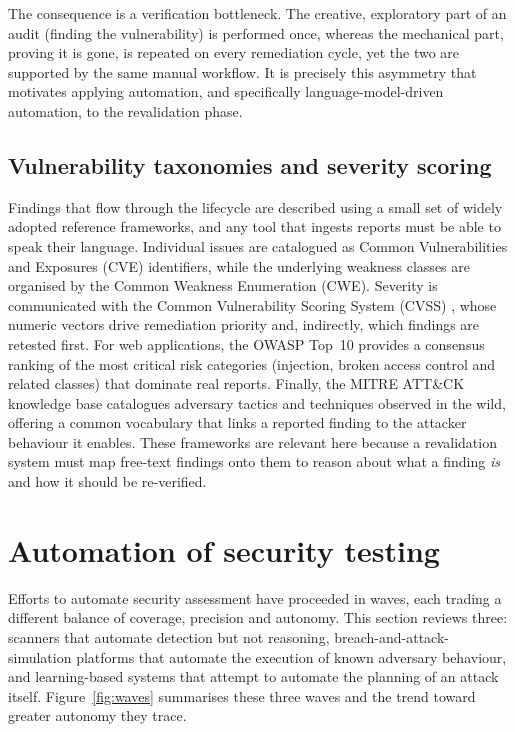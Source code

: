 The consequence is a verification bottleneck. The creative, exploratory part of an
audit (finding the vulnerability) is performed once, whereas the mechanical
part, proving it is gone, is repeated on every remediation cycle, yet the two
are supported by the same manual workflow. It is precisely this asymmetry that
motivates applying automation, and specifically language-model-driven automation,
to the revalidation phase.

\subsection{Vulnerability taxonomies and severity scoring}
\label{subsec:taxonomies}

Findings that flow through the lifecycle are described using a small set of widely
adopted reference frameworks, and any tool that ingests reports must be able to
speak their language. Individual issues are catalogued as Common Vulnerabilities
and Exposures (CVE) identifiers, while the underlying weakness classes
are organised by the Common Weakness Enumeration (CWE). Severity is
communicated with the Common Vulnerability Scoring System (CVSS) \cite{cvss},
whose numeric vectors drive remediation priority and, indirectly, which findings
are retested first. For web applications, the OWASP Top~10
provides a consensus ranking of the most critical risk categories (injection,
broken access control and related classes) that dominate real reports.
Finally, the MITRE ATT\&CK knowledge base \cite{mitre_attack} catalogues adversary
tactics and techniques observed in the wild, offering a common vocabulary that
links a reported finding to the attacker behaviour it enables. These frameworks
are relevant here because a revalidation system must map free-text findings onto
them to reason about what a finding \emph{is} and how it should be re-verified.

\section{Automation of security testing}
\label{sec:automation}

Efforts to automate security assessment have proceeded in waves, each trading a
different balance of coverage, precision and autonomy. This section reviews three:
scanners that automate detection but not reasoning, breach-and-attack-simulation
platforms that automate the execution of known adversary behaviour, and
learning-based systems that attempt to automate the planning of an attack itself.
Figure~\ref{fig:waves} summarises these three waves and the trend toward greater
autonomy they trace.


